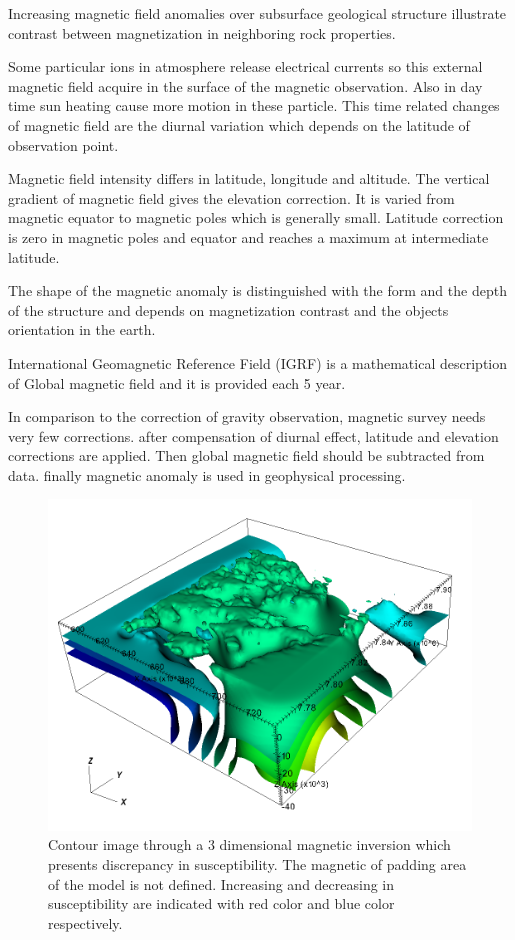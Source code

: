 Increasing magnetic field anomalies over subsurface geological structure illustrate contrast between magnetization in neighboring rock properties.

Some particular ions in atmosphere release electrical currents so this external magnetic field acquire in the surface of the magnetic observation. Also in day time sun heating cause more motion in these particle. This time related changes of magnetic field are the diurnal variation which depends on the latitude of observation point. 

Magnetic field intensity differs in latitude, longitude and altitude. The vertical gradient of magnetic field gives the elevation correction. It is varied from magnetic equator to magnetic poles which is generally small. Latitude correction is zero in magnetic poles and equator and reaches a maximum at intermediate latitude.

The shape of the magnetic anomaly is distinguished with the form and the depth of the structure and depends on magnetization contrast and the objects orientation in the earth.

International Geomagnetic Reference Field (IGRF) is a mathematical description of Global magnetic field and it  is provided each 5 year.

In comparison to the correction of gravity observation, magnetic survey needs very few corrections. after compensation of diurnal effect, latitude and elevation corrections are applied. Then global magnetic field should be subtracted from data. finally magnetic anomaly is used in geophysical processing.

\begin{figure}
\centering
\includegraphics[width=\textwidth]{sus3Dc.png}
\caption{Contour image through a 3 dimensional magnetic inversion which presents discrepancy in susceptibility. The magnetic of padding area of the model is not defined. Increasing and decreasing in susceptibility are indicated with red color and blue color respectively.}
\end{figure}

